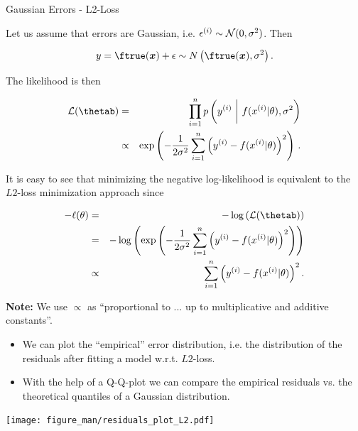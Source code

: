 \begin{vbframe}{Gaussian Errors - L2-Loss} 

Let us assume that errors are Gaussian, i.e. $\epsilon^{(i)} \sim \mathcal{N}(0, \sigma^2)$. Then


$$
y = \ftrue(\xv) + \eps \sim N\left(\ftrue(\xv), \sigma^2\right). 
$$

The likelihood is then 

\begin{eqnarray*}
\LL(\thetab) &=& \prod_{i=1}^n \pdf\left(\yi ~\bigg|~ \fxit, \sigma^2\right) \\ &\propto& \exp\left(-\frac{1}{2\sigma^2}\sumin \left(\yi - \fxit\right)^2\right)\,.
\end{eqnarray*}

\framebreak 

It is easy to see that minimizing the negative log-likelihood is equivalent to the $L2$-loss minimization approach since

\begin{eqnarray*}
- \llt &=& - \log\left(\LL(\thetab)\right) \\
&=& - \log\left(\exp\left(-\frac{1}{2\sigma^2}\sumin \left(\yi - \fxit\right)^2\right)\right) \\
&\propto& \sumin \left(\yi - \fxit\right)^2.
\end{eqnarray*}


\begin{footnotesize}
\textbf{Note:} We use $\propto$ as \enquote{proportional to ... up to multiplicative and additive constants}. 
\end{footnotesize}

\framebreak 

\begin{itemize}
\item We can plot the \enquote{empirical} error distribution, i.e. the distribution of the residuals after fitting a model w.r.t. $L2$-loss.
\item With the help of a Q-Q-plot we can compare the empirical residuals vs. the theoretical quantiles of a Gaussian distribution.  
\end{itemize}

\texttt{[image: figure\_man/residuals\_plot\_L2.pdf]}

\end{vbframe}


